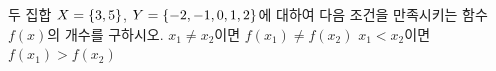 두 집합 $X=\{3{,}\mkern3mu\mathopen{}5\}$, $Y=\{-2{,}\mkern3mu\mathopen{}-1{,}\mkern3mu\mathopen{}0{,}\mkern3mu\mathopen{}1{,}\mkern3mu\mathopen{}2\}$에 대하여 다음 조건을 만족시키는 함수 $f(x)$의 개수를 구하시오. 
 $x_1\ne x_2$이면 $f(x_1)\ne f(x_2)$
 $x_1<x_2$이면 $f(x_1)>f(x_2)$
